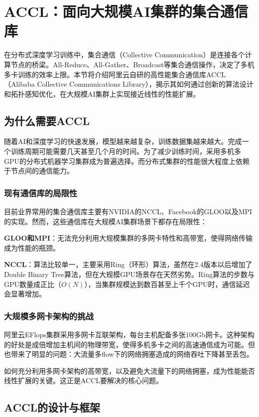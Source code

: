 \section{ACCL：面向大规模AI集群的集合通信库}

在分布式深度学习训练中，集合通信（Collective Communication）是连接各个计算节点的桥梁。All-Reduce、All-Gather、Broadcast等集合通信操作，决定了多机多卡训练的效率上限。本节将介绍阿里云自研的高性能集合通信库ACCL（Alibaba Collective Communications Library），揭示其如何通过创新的算法设计和拓扑感知优化，在大规模AI集群上实现接近线性的性能扩展。

\subsection{为什么需要ACCL}

随着AI和深度学习的快速发展，模型越来越复杂，训练数据集越来越大。完成一个训练周期可能需要几天甚至几个月的时间。为了减少训练时间，采用多机多GPU的分布式机器学习集群成为普遍选择。而分布式集群的性能很大程度上依赖于节点间的通信能力。

\subsubsection{现有通信库的局限性}

目前业界常用的集合通信库主要有NVIDIA的NCCL、Facebook的GLOO以及MPI的实现。然而，这些通信库在大规模AI集群场景下都存在局限性：

\textbf{GLOO和MPI}：无法充分利用大规模集群的多网卡特性和高带宽，使得网络传输成为性能的瓶颈。

\textbf{NCCL}：算法比较单一，主要采用Ring（环形）算法，虽然在2.4版本以后增加了Double Binary Tree算法，但在大规模GPU场景存在天然劣势。Ring算法的步数与GPU数量成正比（$O(N)$），当集群规模达到数百甚至上千个GPU时，通信延迟会显著增加。

\subsubsection{大规模多网卡架构的挑战}

阿里云EFlops集群采用多网卡互联架构，每台主机配备多张100Gb网卡。这种架构的好处是成倍增加主机间的物理带宽，使得多机多卡之间的高速通信成为可能。但也带来了明显的问题：大流量多flow下的网络拥塞造成的网络吞吐下降甚至丢包。

如何充分利用多网卡架构的高带宽，以及避免大流量下的网络拥塞，成为性能能否线性扩展的关键。这正是ACCL要解决的核心问题。

\subsection{ACCL的设计与框架}

